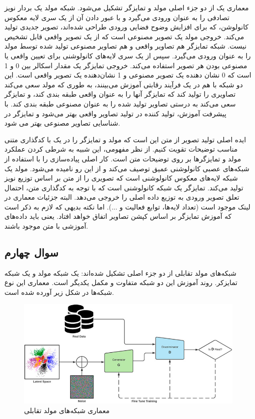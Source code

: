 \documentclass{article}
\begin{document}
 معماری یک  از دو جزء اصلی مولد و تمایزگر تشکیل می‌شود. شبکه مولد یک بردار نویز تصادفی را به عنوان ورودی می‌گیرد و با عبور دادن آن از یک سری لایه معکوس کانولوشن، که برای افزایش وضوح فضایی ورودی طراحی شده‌اند، تصویر جدیدی تولید می‌کند. خروجی مولد یک تصویر مصنوعی است که از یک تصویر واقعی قابل تشخیص نیست. شبکه تمایزگر هم تصاویر واقعی و هم تصاویر مصنوعی تولید شده توسط مولد را به عنوان ورودی می‌گیرد. سپس از یک سری لایه‌های کانولوشنی برای تعیین واقعی یا مصنوعی بودن هر تصویر استفاده می‌کند. خروجی تمایزگر یک مقدار اسکالر بین 0 و 1 است که 0 نشان دهنده یک تصویر مصنوعی و 1 نشان‌دهنده یک تصویر واقعی است. این دو شبکه با هم در یک فرآیند رقابتی آموزش می‌بینند، به طوری که مولد سعی می‌کند تصاویری را تولید کند که تمایزگر آنها را به عنوان واقعی طبقه بندی کند، و تمایزگر سعی می‌کند به درستی تصاویر تولید شده را به عنوان مصنوعی طبقه بندی کند. با پیشرفت آموزش، تولید کننده در تولید تصاویر واقعی بهتر می‌شود و تمایزگر در شناسایی تصاویر مصنوعی بهتر می شود.


ایده اصلی تولید تصویر از متن این است که مولد و تمایزگر را در یک  با کدگذاری متنی مناسب توضیحات تقویت کنیم. از نظر مفهومی، این شبیه به شرطی کردن عملکرد مولد و تمایزگرها بر روی توضیحات متن است. کار اصلی پیاده‌سازی را با استفاده از شبکه‌های عصبی کانولوشنی عمیق توصیف می‌کند و از این رو  نامیده می‌شود. مولد یک شبکه لایه‌های معکوس کانولوشنی است که تصویری را از متن بر اساس توزیع نویز تولید می‌کند. تمایزگر یک شبکه کانولوشنی است که با توجه به کدگذاری متن، احتمال تعلق تصویر ورودی به توزیع داده اصلی را خروجی می‌دهد. البته جزئیات معماری در لینک موجود است (تعداد لایه‌ها، توابع فعالیت و ...). اما نکته بدیهی که لازم به ذکر است که آموزش تمایزگر بر اساس کپشن تصاویر اتفاق خواهد افتاد. یعنی باید داده‌های آموزشی با متن موجود باشند.


\subsection{سوال چهارم}
شبکه‌های مولد تقابلی از دو جزء اصلی تشکیل شده‌اند: یک شبکه مولد و یک شبکه تمایزکر. روند آموزش این دو شبکه متفاوت و مکمل یکدیگر است. معماری این نوع شبکه‌ها در شکل زیر آورده شده است.

\begin{figure}[!h]
    \centering\includegraphics[scale=.55]{./p4}
    \caption{معماری شبکه‌های مولد تقابلی}\label{fig.41}
\end{figure}
\end{document}
